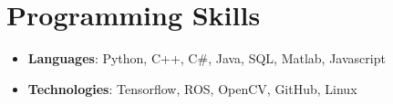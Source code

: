 \documentclass[letterpaper,11pt]{article}
\newcommand{\resumeSubHeadingListStart}{\begin{itemize}[leftmargin=*]}
\newcommand{\resumeSubHeadingListEnd}{\end{itemize}}
\begin{document}
\section{Programming Skills}
  \resumeSubHeadingListStart
    \item{
      \textbf{Languages}{: Python, C++, C\#, Java, SQL, Matlab, Javascript}
      \hfill
    }
    \item{
    	\textbf{Technologies}{: Tensorflow, ROS, OpenCV, GitHub, Linux }
    }
  \resumeSubHeadingListEnd


\end{document}
